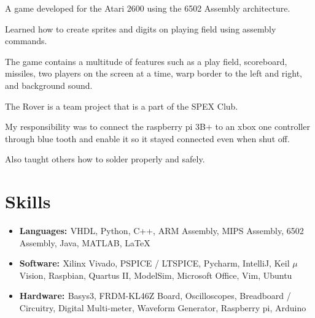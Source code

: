 \documentclass[a4paper]{comcv}
\begin{document}
\vspace{\topsep}
\vspace{\topsep}
    \begin{tightlist}
        \item A game developed for the Atari 2600 using the 6502 Assembly architecture.
        \item Learned how to create sprites and digits on playing field using assembly commands.
        \item The game contains a multitude of features such as a play field, scoreboard, missiles, two players on the screen at a time, warp border to the left and right, and background sound.
\end{tightlist}


\vspace{\topsep}
    \begin{tightlist}
        \item The Rover is a team project that is a part of the SPEX Club.
        \item My responsibility was to connect the raspberry pi 3B+ to an xbox one controller through blue tooth and enable it so it stayed connected even when shut off.
        \item Also taught others how to solder properly and safely.
    \end{tightlist}


\section{Skills}
\begin{itemize}
    \item {\bf{Languages: }}  {VHDL, Python, C++, ARM Assembly, MIPS Assembly, 6502 Assembly, Java, MATLAB, \LaTeX} 
    
    \item {\bf{Software: }} {Xilinx Vivado, PSPICE / LTSPICE, Pycharm, IntelliJ, Keil $\mu$Vision, Raspbian, Quartus II, ModelSim, Microsoft Office, Vim, Ubuntu}
    
    \item {\bf{Hardware: }}  {Basys3,  FRDM-KL46Z Board, Oscilloscopes, Breadboard / Circuitry, Digital Multi-meter, Waveform Generator, Raspberry pi, Arduino} 
\end{itemize}
\end{document}
